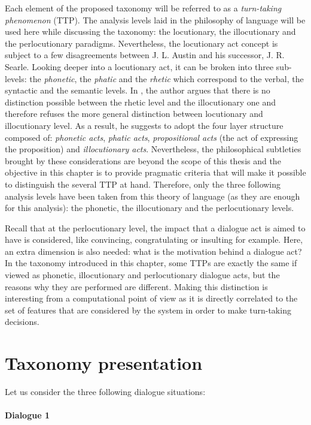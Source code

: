         Each element of the proposed taxonomy will be referred to as a \textit{turn-taking phenomenon} (TTP). The analysis levels laid in the philosophy of language will be used here while discussing the taxonomy: the locutionary, the illocutionary and the perlocutionary paradigms. Nevertheless, the locutionary act concept is subject to a few disagreements between J. L. Austin and his successor, J. R. Searle. Looking deeper into a locutionary act, it can be broken into three sub-levels: the \textit{phonetic}, the \textit{phatic} and the \textit{rhetic} which correspond to the verbal, the syntactic and the semantic levels.  In \cite{Searle1968}, the author argues that there is no distinction possible between the rhetic level and the illocutionary one and therefore refuses the more general distinction between locutionary and illocutionary level. As a result, he suggests to adopt the four layer structure composed of: \textit{phonetic acts}, \textit{phatic acts}, \textit{propositional acts} (the act of expressing the proposition) and \textit{illocutionary acts}. Nevertheless, the philosophical subtleties brought by these considerations are beyond the scope of this thesis and the objective in this chapter is to provide pragmatic criteria that will make it possible to distinguish the several TTP at hand. Therefore, only the three following analysis levels have been taken from this theory of language (as they are enough for this analysis): the phonetic, the illocutionary and the perlocutionary levels.

        Recall that at the perlocutionary level, the impact that a dialogue act is aimed to have is considered, like convincing, congratulating or insulting for example. Here, an extra dimension is also needed: what is the motivation behind a dialogue act? In the taxonomy introduced in this chapter, some TTPs are exactly the same if viewed as phonetic, illocutionary and perlocutionary dialogue acts, but the reasons why they are performed are different. Making this distinction is interesting from a computational point of view as it is directly correlated to the set of features that are considered by the system in order to make turn-taking decisions.

\section{Taxonomy presentation}

        Let us consider the three following dialogue situations:

        \paragraph{Dialogue 1}

